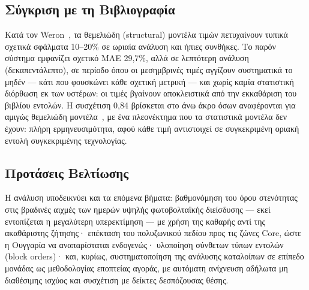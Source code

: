 \subsection{Σύγκριση με τη Βιβλιογραφία}
\label{subsec:literature-comparison}

Κατά τον Weron~\cite{weron2014}, τα θεμελιώδη (structural) μοντέλα τιμών πετυχαίνουν τυπικά σχετικά σφάλματα 10--20\% σε ωριαία ανάλυση και ήπιες συνθήκες. Το παρόν σύστημα εμφανίζει σχετικό MAE 29,7\%, αλλά σε λεπτότερη ανάλυση (δεκαπεντάλεπτο), σε περίοδο όπου οι μεσημβρινές τιμές αγγίζουν συστηματικά το μηδέν --- κάτι που φουσκώνει κάθε σχετική μετρική --- και χωρίς καμία στατιστική διόρθωση εκ των υστέρων: οι τιμές βγαίνουν αποκλειστικά από την εκκαθάριση του βιβλίου εντολών. Η συσχέτιση 0,84 βρίσκεται στο άνω άκρο όσων αναφέρονται για αμιγώς θεμελιώδη μοντέλα~\cite{madani2018,weron2014}, με ένα πλεονέκτημα που τα στατιστικά μοντέλα δεν έχουν: πλήρη ερμηνευσιμότητα, αφού κάθε τιμή αντιστοιχεί σε συγκεκριμένη οριακή εντολή συγκεκριμένης τεχνολογίας.

\subsection{Προτάσεις Βελτίωσης}
\label{subsec:improvement-suggestions}

Η ανάλυση υποδεικνύει και τα επόμενα βήματα: βαθμονόμηση του όρου στενότητας στις βραδινές αιχμές των ημερών υψηλής φωτοβολταϊκής διείσδυσης --- εκεί εντοπίζεται η μεγαλύτερη υπερεκτίμηση --- με χρήση της καθαρής αντί της ακαθάριστης ζήτησης· επέκταση του πολυζωνικού πεδίου προς τις ζώνες Core, ώστε η Ουγγαρία να αναπαρίσταται ενδογενώς· υλοποίηση σύνθετων τύπων εντολών (block orders)· και, κυρίως, συστηματοποίηση της ανάλυσης καταλοίπων σε επίπεδο μονάδας ως μεθοδολογίας εποπτείας αγοράς, με αυτόματη ανίχνευση αδήλωτα μη διαθέσιμης ισχύος και συσχέτιση με δείκτες δεσπόζουσας θέσης.
